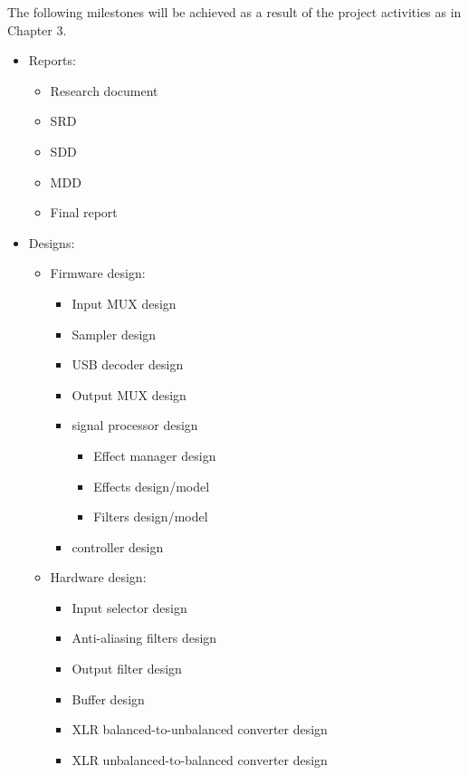 The following milestones will be achieved as a result of the project activities as in Chapter 3.
\begin{itemize}
    \setlength\itemsep{-0.2em}
    \item Reports:
    \begin{itemize}
        \setlength\itemsep{-0.2em}
        \item Research document
        \item SRD
        \item SDD
        \item MDD
        \item Final report
    \end{itemize}
    \item Designs:
    \begin{itemize}
        \setlength\itemsep{-0.2em}
        \item Firmware design:
        \begin{itemize}
            \setlength\itemsep{-0.2em}
            \item Input MUX design
            \item Sampler design
            \item USB decoder design
            \item Output MUX design
            \item signal processor design
            \begin{itemize}
                \setlength\itemsep{-0.2em}
                \item Effect manager design
                \item Effects design/model
                \item Filters design/model
            \end{itemize}
            \item controller design
        \end{itemize}
        \item Hardware design:
        \begin{itemize}
            \setlength\itemsep{-0.2em}
            \item Input selector design
            \item Anti-aliasing filters design
            \item Output filter design
            \item Buffer design
            \item XLR balanced-to-unbalanced converter design
            \item XLR unbalanced-to-balanced converter design

\end{itemize}
\end{itemize}
\end{itemize}
